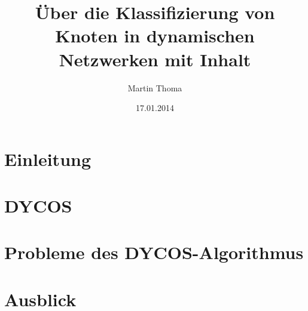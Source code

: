 \documentclass[runningheads]{llncs}
\begin{document}
\mainmatter
\title{Über die Klassifizierung von Knoten in dynamischen Netzwerken mit Inhalt}
\author{Martin Thoma}
\date{17.01.2014}
\maketitle

\begin{abstract}%

\end{abstract}

\section{Einleitung}


\section{DYCOS}


\section{Probleme des DYCOS-Algorithmus}


\section{Ausblick}


%


\end{document}
